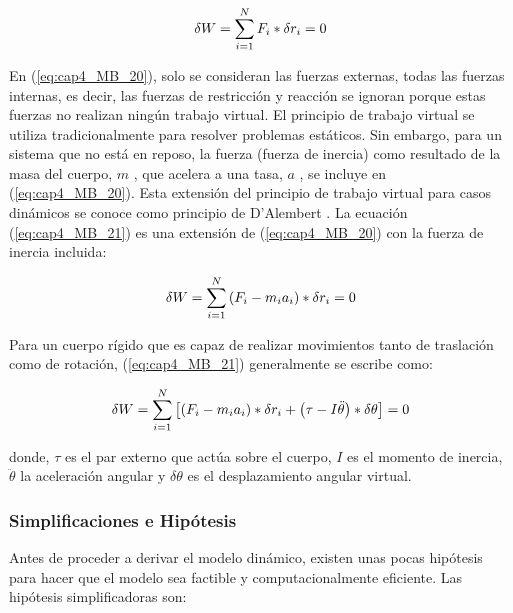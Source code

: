         \begin{equation}
            \delta W= \sum _{i=1}^{N}F_{i} \ast \delta r_{i}=0\\
            \label{eq:cap4_MB_20}
        \end{equation}

        
        En (\ref{eq:cap4_MB_20}), solo se consideran las fuerzas externas, todas las fuerzas internas, es decir, las fuerzas de restricción y reacción se ignoran porque estas fuerzas no realizan ningún trabajo virtual. El principio de trabajo virtual se utiliza tradicionalmente para resolver problemas estáticos. Sin embargo, para un sistema que no está en reposo, la fuerza (fuerza de inercia) como resultado de la masa del cuerpo,  \( m \) , que acelera a una tasa,  \( a \) , se incluye en (\ref{eq:cap4_MB_20}). Esta extensión del principio de trabajo virtual para casos dinámicos se conoce como principio de D'Alembert \cite{}. La ecuación (\ref{eq:cap4_MB_21}) es una extensión de  (\ref{eq:cap4_MB_20}) con la fuerza de inercia incluida:
        
        \begin{equation}
          \delta W= \sum _{i=1}^{N} \left( F_{i}-m_{i}a_{i} \right) \ast \delta r_{i}=0 \\
         \label{eq:cap4_MB_21}
        \end{equation}

        
        Para un cuerpo rígido que es capaz de realizar movimientos tanto de traslación como de rotación, (\ref{eq:cap4_MB_21}) generalmente se escribe como:
        
        \begin{equation}
          \delta W= \sum _{i=1}^{N} \left[  \left( F_{i}-m_{i}a_{i} \right) \ast \delta r_{i}+ \left(  \tau-I\ddot{ \theta } \right) \ast \delta  \theta  \right] =0 \\
         \label{eq:cap4_MB_22}
        \end{equation}
        
        donde,  $\tau $  es el par externo que actúa sobre el cuerpo,  $ I $  es el momento de inercia,  $\ddot{ \theta }$   la aceleración angular y  $ \delta  \theta  $  es el desplazamiento angular virtual.
        
        \newpage

        \subsubsection{Simplificaciones e Hipótesis}
        Antes de proceder a derivar el modelo dinámico, existen unas pocas hipótesis para hacer que el modelo sea factible y computacionalmente eficiente. Las hipótesis simplificadoras son:
        
